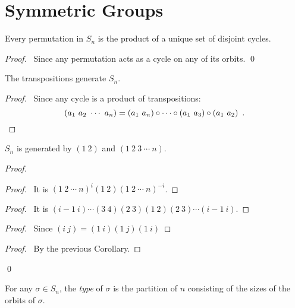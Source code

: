 
\section{Symmetric Groups}

\begin{prop}
Every permutation in $S_n$ is the product of a unique set of disjoint cycles.
\end{prop}

\begin{proof}
\pf\ Since any permutation acts as a cycle on any of its orbits. \qed
\end{proof}

\begin{cor}
The transpositions generate $S_n$.
\end{cor}

\begin{proof}
\pf\ Since any cycle is a product of transpositions:
\[ (a_1\ a_2\ \cdots\ a_n) = (a_1\ a_n) \circ \cdots \circ (a_1\ a_3) \circ (a_1\ a_2) \enspace . \qed \]
\end{proof}

\begin{cor}
$S_n$ is generated by $(1\ 2)$ and $(1\ 2\ 3\ \cdots\ n)$.
\end{cor}

\begin{proof}
\pf
{}
\begin{proof}
	\pf\ It is $(1\ 2\ \cdots\ n)^i (1\ 2) (1\ 2\ \cdots\ n)^{-i}$.
\end{proof}
\begin{proof}
	\pf\ It is $(i-1\ i)\cdots (3\ 4)(2\ 3)(1\ 2)(2\ 3) \cdots (i-1\ i)$.
\end{proof}
\begin{proof}
	\pf\ Since $(i\ j) = (1\ i)(1\ j)(1\ i)$
\end{proof}
\begin{proof}
	\pf\ By the previous Corollary.
\end{proof}
\qed	
\end{proof}

\begin{df}[Type]
For any $\sigma \in S_n$, the \emph{type} of $\sigma$ is the partition of $n$ consisting of the sizes of the orbits of $\sigma$.
\end{df}

